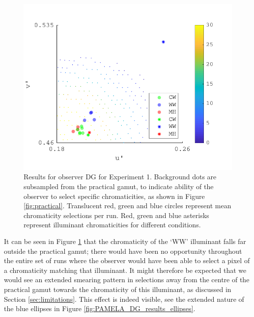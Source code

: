 \begin{figure}[hbtp] %
\includegraphics[max width=\textwidth]{figs/tablet/PAMELA_DG_results.pdf} 
\caption{Results for observer DG for Experiment 1. Background dots are subsampled from the practical gamut, to indicate ability of the observer to select specific chromaticities, as shown in Figure \ref{fig:practical}. Translucent red, green and blue circles represent mean chromaticity selections per run. Red, green and blue asterisks represent illuminant chromaticities for different conditions.}
\label{fig:PAMELA_DG_results}
\end{figure}

It can be seen in Figure \ref{fig:PAMELA_DG_results} that the chromaticity of the `WW' illuminant falls far outside the practical gamut; there would have been no opportunity throughout the entire set of runs where the observer would have been able to select a pixel of a chromaticity matching that illuminant. It might therefore be expected that we would see an extended smearing pattern in selections away from the centre of the practical gamut towards the chromaticity of this illuminant, as discussed in Section \ref{sec:limitations}. This effect is indeed visible, see the extended nature of the blue ellipses in Figure \ref{fig:PAMELA_DG_results_ellipses}.

